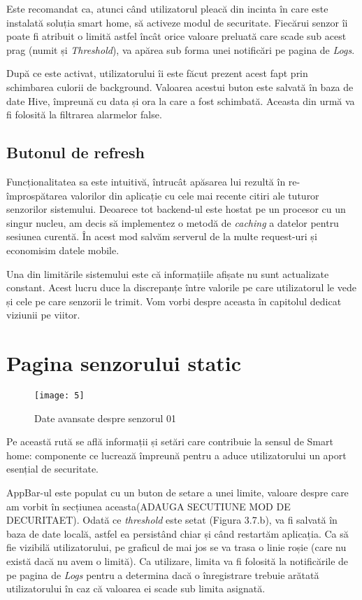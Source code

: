 Este recomandat ca, atunci când utilizatorul pleacă din incinta în care este instalată soluția smart home, să activeze modul de securitate. Fiecărui senzor îi poate fi atribuit o limită astfel încât orice valoare preluată  care scade sub acest prag (numit și \emph{Threshold}), va apărea sub forma unei notificări pe pagina de \emph{Logs}.

După ce este activat, utilizatorului îi este făcut prezent acest fapt prin schimbarea culorii de background. Valoarea acestui buton este salvată în baza de date Hive, împreună cu data și ora la care a fost schimbată. Aceasta din urmă va fi folosită la filtrarea alarmelor false.

\subsection{Butonul de refresh}

Funcționalitatea sa este intuitivă, întrucât apăsarea lui rezultă în re-împrospătarea valorilor din aplicație cu cele mai recente citiri ale tuturor senzorilor sistemului. Deoarece tot backend-ul este hostat pe un procesor cu un singur nucleu, am decis să implementez o metodă de \emph{caching} a datelor pentru sesiunea curentă. În acest mod salvăm serverul de la multe request-uri și economisim datele mobile.

Una din limitările sistemului este că informațiile afișate nu sunt actualizate constant. Acest lucru duce la discrepanțe între valorile pe care utilizatorul le vede și cele pe care senzorii le trimit. Vom vorbi despre aceasta în capitolul dedicat viziunii pe viitor.

\break

\section{Pagina senzorului static}

\begin{wrapfigure}{r}{0.3\textwidth}
	\texttt{[image: 5]}
	\caption{Date avansate despre senzorul 01}
	\label{fig:5}
\end{wrapfigure}

Pe această rută se află informații și setări care contribuie la sensul de Smart home: componente ce lucrează împreună pentru a aduce utilizatorului un aport esențial de securitate.

AppBar-ul este populat cu un buton de setare a unei limite, valoare despre care am vorbit în secțiunea aceasta(ADAUGA SECUTIUNE MOD DE DECURITAET). Odată ce \emph{threshold} este setat (Figura 3.7.b), va fi salvată în baza de date locală, astfel ea persistând chiar și când restartăm aplicația. Ca să fie vizibilă utilizatorului, pe graficul de mai jos se va trasa o linie roșie (care nu există dacă nu avem o limită). Ca utilizare, limita va fi folosită la notificările de pe pagina de \emph{Logs} pentru a determina dacă o înregistrare trebuie arătată utilizatorului în caz că valoarea ei scade sub limita asignată.

